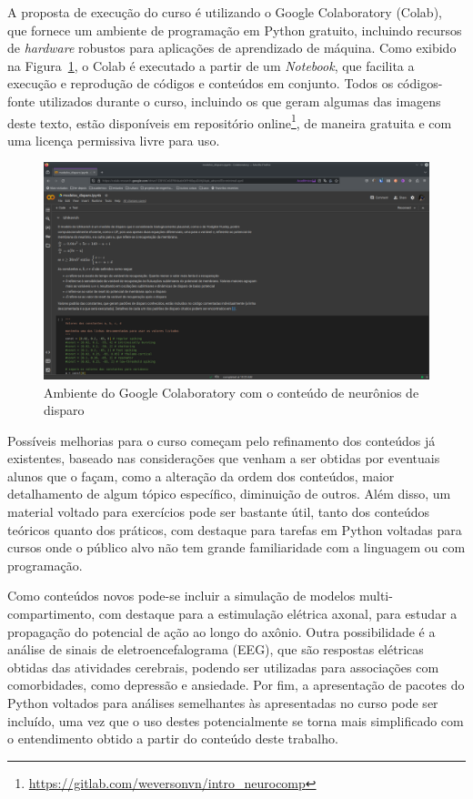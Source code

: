 A proposta de execução do curso é utilizando o Google Colaboratory (Colab), que fornece um ambiente de programação em Python gratuito, incluindo recursos de \textit{hardware} robustos para aplicações de aprendizado de máquina.
Como exibido na Figura~\ref{fig:colab}, o Colab é executado a partir de um \textit{Notebook}, que facilita a execução e reprodução de códigos e conteúdos em conjunto.
Todos os códigos-fonte utilizados durante o curso, incluindo os que geram algumas das imagens deste texto, estão disponíveis em repositório online\footnote{\url{https://gitlab.com/weversonvn/intro_neurocomp}}, de maneira gratuita e com uma licença permissiva livre para uso.
\begin{figure}[tb]
	\centering
	\caption[Ambiente do Google Colaboratory com o conteúdo de neurônios de disparo]{Ambiente do Google Colaboratory com o conteúdo de neurônios de disparo}
	\label{fig:colab}
	\includegraphics[width=0.7\linewidth]{figs/colab}
\end{figure}

Possíveis melhorias para o curso começam pelo refinamento dos conteúdos já existentes, baseado nas considerações que venham a ser obtidas por eventuais alunos que o façam, como a alteração da ordem dos conteúdos, maior detalhamento de algum tópico específico, diminuição de outros. Além disso, um material voltado para exercícios pode ser bastante útil, tanto dos conteúdos teóricos quanto dos práticos, com destaque para tarefas em Python voltadas para cursos onde o público alvo não tem grande familiaridade com a linguagem ou com programação.

Como conteúdos novos pode-se incluir a simulação de modelos multi-compartimento, com destaque para a estimulação elétrica axonal, para estudar a propagação do potencial de ação ao longo do axônio.
Outra possibilidade é a análise de sinais de eletroencefalograma (EEG), que são respostas elétricas obtidas das atividades cerebrais, podendo ser utilizadas para associações com comorbidades, como depressão e ansiedade.
Por fim, a apresentação de pacotes do Python voltados para análises semelhantes às apresentadas no curso pode ser incluído, uma vez que o uso destes potencialmente se torna mais simplificado com o entendimento obtido a partir do conteúdo deste trabalho.
